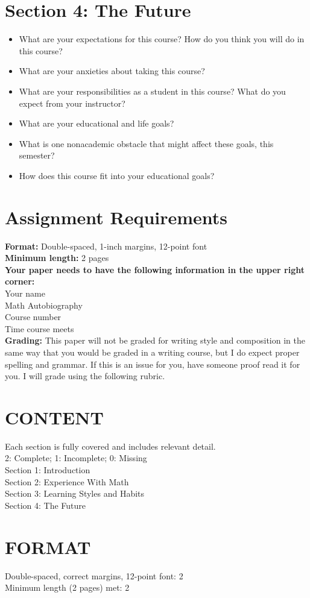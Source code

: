 \documentclass{article}
\begin{document}
\section*{Section 4: The Future}
\begin{itemize}
\item What are your expectations for this course? How do you think you will do in this course?
\item What are your anxieties about taking this course?
\item What are your responsibilities as a student in this course? What do you expect from your instructor?
\item What are your educational and life goals?
\item What is one nonacademic obstacle that might affect these goals, this semester?
\item How does this course fit into your educational goals?
\end{itemize}

\section*{Assignment Requirements}
\textbf{Format:} Double-spaced, 1-inch margins, 12-point font\\
\textbf{Minimum length:} 2 pages\\

\noindent\textbf{Your paper needs to have the following information in the upper right corner:}\\
Your name\\
Math Autobiography\\
Course number \\
Time course meets\\

\textbf{Grading:} This paper will not be graded for writing style and composition in the same way that you would be graded in a writing course, but I do expect proper spelling and grammar. If this is an issue for you, have someone proof read it for you. I will grade using the following rubric.

\section*{CONTENT}
Each section is fully covered and includes relevant detail.\\
2: Complete; 1: Incomplete; 0: Missing\\ 
Section 1: Introduction\hfill{} \enspace{} \enspace{}\\
Section 2: Experience With Math\hfill{} \enspace{} \enspace{}\\
Section 3: Learning Styles and Habits\hfill{} \enspace{} \enspace{}\\
Section 4: The Future\hfill{} \enspace{} \enspace{}\\

\section*{FORMAT}
Double-spaced, correct margins, 12-point font: \hfill{} \enspace{} {\enspace\enspace \color{white} 2}\\
Minimum length (2 pages) met: \hfill{} \enspace{} {\enspace\enspace \color{white} 2}
\end{document}
